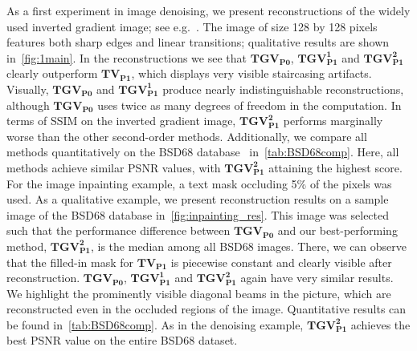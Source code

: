 \documentclass{article}
\begin{document}
	As a first experiment in image denoising, we present reconstructions of the widely used inverted gradient image; see e.g.~\cite{Ba23, Se11}.
	The image of size 128 by 128 pixels features both sharp edges and linear transitions; qualitative results are shown in~\cref{fig:1main}.
	In the reconstructions we see that $\mathbf{TGV_{P0}}$, $\mathbf{TGV^1_{P1}}$ and $\mathbf{TGV^2_{P1}}$ clearly outperform $\mathbf{TV_{P1}}$, which displays very visible staircasing artifacts.
	Visually, $\mathbf{TGV_{P0}}$ and $\mathbf{TGV_{P1}^1}$ produce nearly indistinguishable reconstructions, although $\mathbf{TGV_{P0}}$ uses twice as many degrees of freedom in the computation.
	In terms of SSIM on the inverted gradient image, $\mathbf{TGV_{P1}^2}$ performs marginally worse than the other second-order methods.
	Additionally, we compare all methods quantitatively on the BSD68 database~\cite{Ma01} in~\cref{tab:BSD68comp}.
	Here, all methods achieve similar PSNR values, with $\mathbf{TGV^2_{P1}}$ attaining the highest score.
	For the image inpainting example, a text mask occluding 5\% of the pixels was used.
	As a qualitative example, we present reconstruction results on a sample image of the BSD68 database in~\cref{fig:inpainting_res}.
	This image was selected such that the performance difference between $\mathbf{TGV_{P0}}$ and our best-performing method, $\mathbf{TGV_{P1}^2}$, is the median among all BSD68 images.
	There, we can observe that the filled-in mask for $\mathbf{TV_{P1}}$ is piecewise constant and clearly visible after reconstruction.
	$\mathbf{TGV_{P0}}$, $\mathbf{TGV^1_{P1}}$ and $\mathbf{TGV^2_{P1}}$ again have very similar results. 
	We highlight the prominently visible diagonal beams in the picture, which are reconstructed even in the occluded regions of the image.
	Quantitative results can be found in~\cref{tab:BSD68comp}.
	As in the denoising example, $\mathbf{TGV^2_{P1}}$ achieves the best PSNR value on the entire BSD68 dataset.
\end{document}
